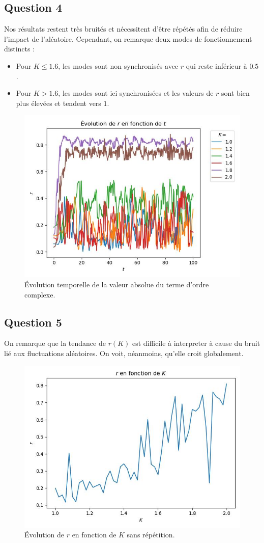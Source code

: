 \documentclass[a4paper, 11pt]{article}
\begin{document}
\subsection*{Question 4}
Nos résultats restent très bruités et nécessitent d'être répétés afin de réduire l'impact de l'aléatoire.
Cependant, on remarque deux modes de fonctionnement distincts :
\begin{itemize}
    \item Pour $K \leq 1.6$, les modes sont non synchronisés avec $r$ qui reste inférieur à $0.5$.
    \item Pour $K > 1.6$, les modes sont ici synchronisées et les valeurs de $r$ sont bien plus élevées et tendent vers $1$.
\end{itemize}
\begin{figure}[H]
    \centering
    \includegraphics[width=0.6\linewidth]{pics/kura4.jpg}
    \caption{Évolution temporelle de la valeur absolue du terme d'ordre complexe.}
\end{figure}

\subsection*{Question 5}
On remarque que la tendance de $r(K)$ est difficile à interpreter à cause du bruit lié aux fluctuations aléatoires. On voit, néanmoins, qu'elle croit globalement.
\begin{figure}[H]
    \centering
    \includegraphics[width=0.5\linewidth]{pics/kura5.jpg}
    \caption{Évolution de $r$ en fonction de $K$ sans répétition.}
\end{figure}
\end{document}
